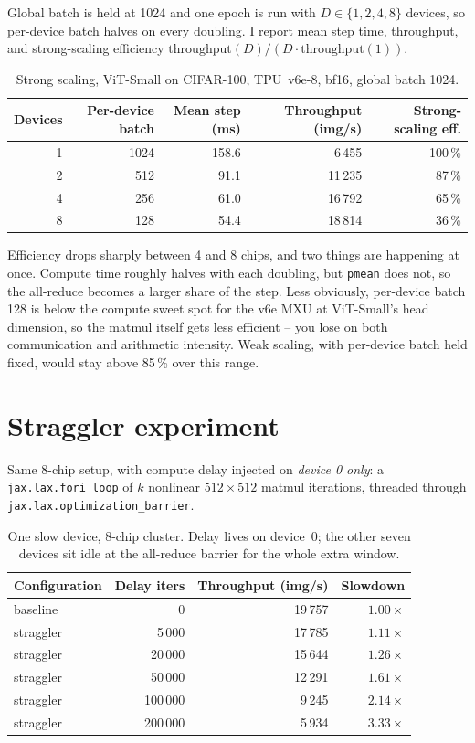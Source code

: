 \documentclass[11pt]{article}
\begin{document}
Global batch is held at 1024 and one epoch is run with $D \in \{1,2,4,8\}$ devices, so
per-device batch halves on every doubling. I report mean step time, throughput, and
strong-scaling efficiency $\mathrm{throughput}(D)/(D\cdot\mathrm{throughput}(1))$.

\begin{table}[h]
\centering
\small
\begin{tabular}{@{}rrrrr@{}}
\toprule
Devices & Per-device batch & Mean step (ms) & Throughput (img/s) & Strong-scaling eff. \\
\midrule
1 & 1024 & 158.6 &  6\,455 & 100\,\% \\
2 &  512 &  91.1 & 11\,235 &  87\,\% \\
4 &  256 &  61.0 & 16\,792 &  65\,\% \\
8 &  128 &  54.4 & 18\,814 &  36\,\% \\
\bottomrule
\end{tabular}
\caption{Strong scaling, ViT-Small on CIFAR-100, TPU~v6e-8, bf16, global batch 1024.}
\label{tab:scaling}
\end{table}

Efficiency drops sharply between 4 and 8 chips, and two things are happening at once.
Compute time roughly halves with each doubling, but \texttt{pmean} does not, so the
all-reduce becomes a larger share of the step. Less obviously, per-device batch 128 is
below the compute sweet spot for the v6e MXU at ViT-Small's head dimension, so the matmul
itself gets less efficient -- you lose on both communication and arithmetic intensity.
Weak scaling, with per-device batch held fixed, would stay above 85\,\% over this range.

\section*{Straggler experiment}

Same 8-chip setup, with compute delay injected on \emph{device 0 only}: a
\texttt{jax.lax.fori\_loop} of $k$ nonlinear $512{\times}512$ matmul iterations, threaded
through \texttt{jax.lax.optimization\_barrier}.

\begin{table}[h]
\centering
\small
\begin{tabular}{@{}lrrr@{}}
\toprule
Configuration & Delay iters & Throughput (img/s) & Slowdown \\
\midrule
baseline  &        0 & 19\,757 & $1.00\times$ \\
straggler &    5\,000 & 17\,785 & $1.11\times$ \\
straggler &   20\,000 & 15\,644 & $1.26\times$ \\
straggler &   50\,000 & 12\,291 & $1.61\times$ \\
straggler &  100\,000 &  9\,245 & $2.14\times$ \\
straggler &  200\,000 &  5\,934 & $3.33\times$ \\
\bottomrule
\end{tabular}
\caption{One slow device, 8-chip cluster. Delay lives on device~0; the other seven devices sit idle at the all-reduce barrier for the whole extra window.}
\label{tab:straggler}
\end{table}
\end{document}
